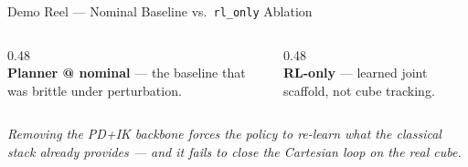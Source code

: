 \documentclass[aspectratio=169, 10pt]{beamer}
\begin{document}
\begin{frame}{Demo Reel --- Nominal Baseline vs.\ \texttt{rl\_only} Ablation}
  \small
  \begin{columns}[T]
    \begin{column}{0.48\textwidth}
      \centering
      \vspace{0.2em}\\
      \scriptsize \textbf{Planner @ nominal} --- the baseline that was brittle under perturbation.
    \end{column}
    \begin{column}{0.48\textwidth}
      \centering
      \vspace{0.2em}\\
      \scriptsize \textbf{RL-only} --- learned joint scaffold, not cube tracking.
    \end{column}
  \end{columns}

  \vspace{0.3em}
  \scriptsize\textit{Removing the PD+IK backbone forces the policy to
  re-learn what the classical stack already provides --- and it fails
  to close the Cartesian loop on the real cube.}
\end{frame}
\end{document}
